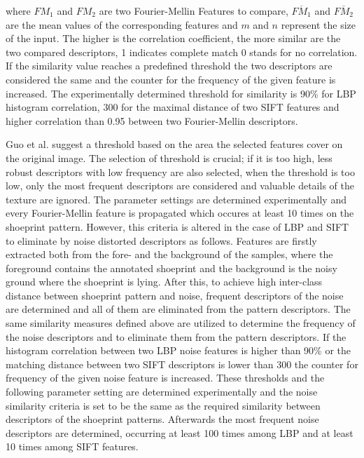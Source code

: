 \documentclass[draft,final]{vutinfth} %
\begin{document}
\label{FMcorr}
where $FM_{1}$ and $FM_{2}$ are two Fourier-Mellin Features to compare, $\overline{FM_{1}}$ and $\overline{FM_{2}}$ are the mean values of the corresponding features and $m$ and $n$ represent the size of the input.
The higher is the correlation coefficient, the more similar are the two compared descriptors, 1 indicates complete match 0 stands for no correlation.
If the similarity value reaches a predefined threshold the two descriptors are considered the same and the counter for the frequency of the given feature is increased.
The experimentally determined threshold for similarity is  90\% for LBP histogram correlation, 300 for the maximal distance of two SIFT features and higher correlation than 0.95 between two Fourier-Mellin descriptors.
\par
Guo et al. \cite{guo2012discriminative} suggest a threshold based on the area the selected features cover on the original image.
The selection of threshold is crucial; if it is too high, less robust descriptors with low frequency are also selected, when the threshold is too low, only the most frequent descriptors are considered and valuable details of the texture are ignored.
The parameter settings are determined experimentally and every Fourier-Mellin feature is propagated which occures at least 10 times on the shoeprint pattern.
However, this criteria is altered in the case of LBP and SIFT to eliminate by noise distorted descriptors as follows.
Features are firstly extracted both from the fore- and the background of the samples, where the foreground contains the annotated shoeprint and the background is the noisy ground where the shoeprint is lying. 
After this, to achieve high inter-class distance between shoeprint pattern and noise, frequent descriptors of the noise are determined and all of them are eliminated from the pattern descriptors.
The same similarity measures defined above are utilized to determine the frequency of the noise descriptors and to eliminate them from the pattern descriptors.
If the histogram correlation between two LBP noise features is higher than 90\% or the matching distance between two SIFT descriptors is lower than 300 the counter for frequency of the given noise feature is increased.
These thresholds and the following parameter setting are determined experimentally and the noise similarity criteria is set to be the same as the required similarity between descriptors of the shoeprint patterns.
Afterwards the most frequent noise descriptors are determined, occurring at least 100 times among LBP and at least 10 times among SIFT features.
\end{document}
